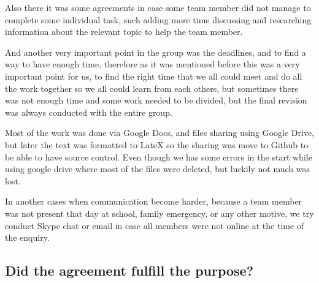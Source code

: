 Also there it was some agreements in case some team member did not manage to complete some individual task, such adding more time discussing and researching information about the relevant topic to help the team member.

And another very important point in the group was the deadlines, and to find a way to have enough time, therefore as it was mentioned before this was a very important point for us, to find the right time that we all could meet and do all the work together so we all could learn from each others, but sometimes there was not enough time and some work needed to be divided, but the final revision was always conducted with the entire group.

Most of the work was done via Google Docs, and files sharing using Google Drive, but later the text was formatted to LateX so the sharing was move to Github to be able to have source control. Even though we has some errors in the start while using google drive where most of the files were deleted, but luckily not much was lost.
 
In another cases when communication become harder, because a team member was not present that day at school, family emergency, or any other motive, we try conduct Skype chat or email in case all members were not online at the time of the enquiry.

\subsection*{Did the agreement fulfill the purpose?}

